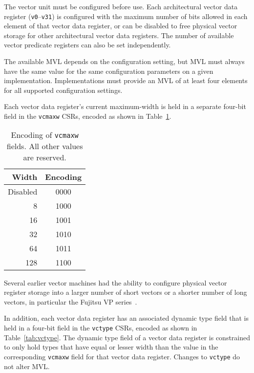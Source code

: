 The vector unit must be configured before use.  Each architectural
vector data register ({\tt v0}--{\tt v31}) is configured with the
maximum number of bits allowed in each element of that vector data
register, or can be disabled to free physical vector storage for other
architectural vector data registers.  The number of available
vector predicate registers can also be set independently.

The available MVL depends on the configuration setting, but MVL must
always have the same value for the same configuration parameters on a
given implementation.  Implementations must provide an MVL of at least
four elements for all supported configuration settings.

Each vector data register's current maximum-width is held in a
separate four-bit field in the {\tt vcmaxw} CSRs, encoded as shown in
Table~\ref{tab:vcmaxw}.

\begin{table}[hbt]
  \centering
  \begin{tabular}{|r|c|}
    \hline
    Width & Encoding \\
    \hline
    Disabled  & 0000 \\
    8         & 1000  \\
    16        & 1001  \\
    32        & 1010  \\
    64        & 1011  \\
    128       & 1100  \\
    \hline
  \end{tabular}
  \caption{Encoding of {\tt vcmaxw} fields. All other values are
    reserved.}
  \label{tab:vcmaxw}
\end{table}

\begin{commentary}
  Several earlier vector machines had the ability to configure
  physical vector register storage into a larger number of short
   vectors or a shorter number of long vectors, in particular the
  Fujitsu VP series~\cite{vp200}.
\end{commentary}

In addition, each vector data register has an associated dynamic type
field that is held in a four-bit field in the {\tt vctype} CSRs,
encoded as shown in Table~\ref{tab:vctype}.  The dynamic type field of
a vector data register is constrained to only hold types that have
equal or lesser width than the value in the corresponding {\tt vcmaxw}
field for that vector data register.  Changes to {\tt vctype} do not
alter MVL.

